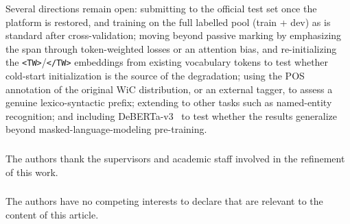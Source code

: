 \documentclass[runningheads]{llncs}
\begin{document}
Several directions remain open: submitting to the official test set once the
platform is restored, and training on the full labelled pool (train + dev) as is
standard after cross-validation; moving beyond passive marking by emphasizing
the span through token-weighted losses or an attention bias, and re-initializing
the \texttt{<TW>}/\texttt{</TW>} embeddings from existing vocabulary tokens to
test whether cold-start initialization is the source of the degradation; using
the POS annotation of the original WiC distribution, or an external tagger, to
assess a genuine lexico-syntactic prefix; extending to other tasks such as
named-entity recognition; and including
DeBERTa-v3~\cite{he2023debertav3} to test whether the results generalize beyond
masked-language-modeling pre-training.

\begin{credits}
\subsubsection{\ackname} The authors thank the supervisors and academic staff
involved in the refinement of this work.

\subsubsection{\discintname} The authors have no competing interests to declare
that are relevant to the content of this article.
\end{credits}
\end{document}
